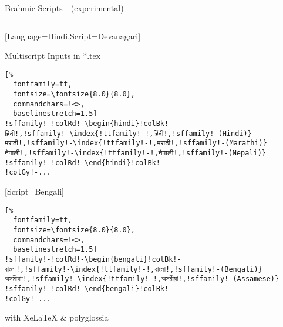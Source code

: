 \documentclass[aspectratio=169,10pt]{beamer}
\begin{document}

\begin{frame}[fragile]{Brahmic Scripts~~{\scriptsize (experimental)}}

\begin{columns}
\begin{column}{53mm}

\setmonofont{Noto Serif Devanagari}[Language=Hindi,Script=Devanagari]
\setmainfont{Noto Sans Mono}
\setsansfont{Noto Sans}
\begin{exampleblock}{Multiscript Inputs in *.tex}
\begin{Verbatim}[%
  fontfamily=tt,
  fontsize=\fontsize{8.0}{8.0},
  commandchars=!<>,
  baselinestretch=1.5]
!sffamily!-!colRd!-\begin{hindi}!colBk!-
हिंदी!,!sffamily!-\index{!ttfamily!-!,हिंदी!,!sffamily!-(Hindi)}
मराठी!,!sffamily!-\index{!ttfamily!-!,मराठी!,!sffamily!-(Marathi)}
नेपाली!,!sffamily!-\index{!ttfamily!-!,नेपाली!,!sffamily!-(Nepali)}
!sffamily!-!colRd!-\end{hindi}!colBk!-
!colGy!-...
\end{Verbatim}
\end{exampleblock}
\setmonofont{Noto Serif Bengali}[Script=Bengali]
\vspace{-4mm}
\begin{exampleblock}{}
\begin{Verbatim}[%
  fontfamily=tt,
  fontsize=\fontsize{8.0}{8.0},
  commandchars=!<>,
  baselinestretch=1.5]
!sffamily!-!colRd!-\begin{bengali}!colBk!-
বাংলা!,!sffamily!-\index{!ttfamily!-!,বাংলা!,!sffamily!-(Bengali)}
অসমীয়াা!,!sffamily!-\index{!ttfamily!-!,অসমীয়া!,!sffamily!-(Assamese)}
!sffamily!-!colRd!-\end{bengali}!colBk!-
!colGy!-...
\end{Verbatim}
\end{exampleblock}
\begin{center}
with XeLaTeX \& polyglossia
\end{center}
\end{column}

\begin{column}{82mm}
\begin{center}
%
\end{center}
\end{column}
\end{columns}

\end{frame}
\end{document}
